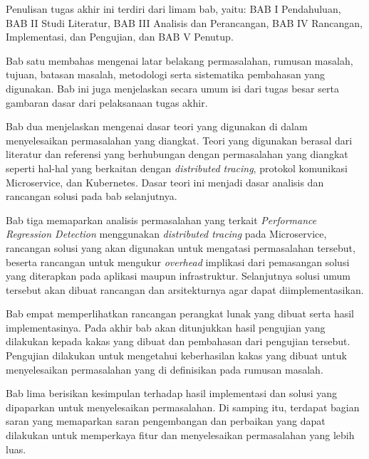 Penulisan tugas akhir ini terdiri dari limam bab, yaitu: BAB I Pendahuluan, BAB II Studi Literatur, BAB III Analisis dan Perancangan, BAB IV Rancangan, Implementasi, dan Pengujian, dan BAB V Penutup.

Bab satu membahas mengenai latar belakang permasalahan, rumusan masalah, tujuan, batasan masalah, metodologi serta sistematika pembahasan yang digunakan. Bab ini juga menjelaskan secara umum isi dari tugas besar serta gambaran dasar dari pelaksanaan tugas akhir.

Bab dua menjelaskan mengenai dasar teori yang digunakan di dalam menyelesaikan permasalahan yang diangkat. Teori yang digunakan berasal dari literatur dan referensi yang berhubungan dengan permasalahan yang diangkat seperti hal-hal yang berkaitan dengan \textit{distributed tracing}, protokol komunikasi Microservice, dan Kubernetes. Dasar teori ini menjadi dasar analisis dan rancangan solusi pada bab selanjutnya.

Bab tiga memaparkan analisis permasalahan yang terkait \textit{Performance Regression Detection} menggunakan \textit{distributed tracing} pada Microservice, rancangan solusi yang akan digunakan untuk mengatasi permasalahan tersebut, beserta rancangan untuk mengukur \textit{overhead} implikasi dari pemasangan solusi yang diterapkan pada aplikasi maupun infrastruktur. Selanjutnya solusi umum tersebut akan dibuat rancangan dan arsitekturnya agar dapat diimplementasikan.

Bab empat memperlihatkan rancangan perangkat lunak yang dibuat serta hasil implementasinya. Pada akhir bab akan ditunjukkan hasil pengujian yang dilakukan kepada kakas yang dibuat dan pembahasan dari pengujian tersebut. Pengujian dilakukan untuk mengetahui keberhasilan kakas yang dibuat untuk menyelesaikan permasalahan yang di definisikan pada rumusan masalah.

Bab lima berisikan kesimpulan terhadap hasil implementasi dan solusi yang dipaparkan untuk menyelesaikan permasalahan. Di samping itu, terdapat bagian saran yang memaparkan saran pengembangan dan perbaikan yang dapat dilakukan untuk memperkaya fitur dan menyelesaikan permasalahan yang lebih luas.

